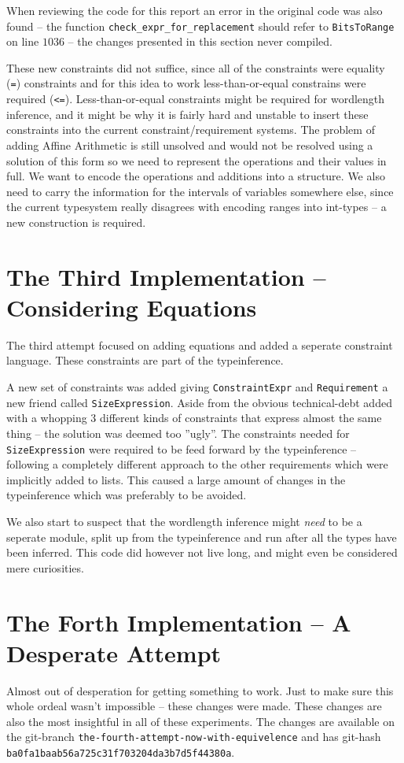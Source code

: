 \documentclass[msc,lith,english]{liuthesis}
\begin{document}
When reviewing the code for this report an error in the original code was also found -- the function \verb+check_expr_for_replacement+ should refer to \verb+BitsToRange+ on line $1036$ -- the changes presented in this section never compiled.

These new constraints did not suffice, since all of the constraints were equality (\verb+=+) constraints and for this idea to work less-than-or-equal constrains were required (\verb+<=+). Less-than-or-equal constraints might be required for wordlength inference, and it might be why it is fairly hard and unstable to insert these constraints into the current constraint/requirement systems. The problem of adding Affine Arithmetic is still unsolved and would not be resolved using a solution of this form so we need to represent the operations and their values in full. We want to encode the operations and additions into a structure. We also need to carry the information for the intervals of variables somewhere else, since the current typesystem really disagrees with encoding ranges into int-types -- a new construction is required. 

\section{The Third Implementation -- Considering Equations}
\label{sec:Third}
The third attempt focused on adding equations and added a seperate constraint language. These constraints are part of the typeinference.

A new set of constraints was added giving \verb+ConstraintExpr+ and \verb+Requirement+ a new friend called \verb+SizeExpression+. Aside from the obvious technical-debt added with a whopping 3 different kinds of constraints that express almost the same thing -- the solution was deemed too ''ugly''. The constraints needed for \verb+SizeExpression+ were required to be feed forward by the typeinference -- following a completely different approach to the other requirements which were implicitly added to lists. This caused a large amount of changes in the typeinference which was preferably to be avoided.

We also start to suspect that the wordlength inference might \textit{need} to be a seperate module, split up from the typeinference and run after all the types have been inferred. This code did however not live long, and might even be considered mere curiosities.

\section{The Forth Implementation -- A Desperate Attempt}
Almost out of desperation for getting something to work. Just to make sure this whole ordeal wasn't impossible -- these changes were made. These changes are also the most insightful in all of these experiments. The changes are available on the git-branch \verb+the-fourth-attempt-now-with-equivelence+ and has git-hash \verb+ba0fa1baab56a725c31f703204da3b7d5f44380a+.
\end{document}
